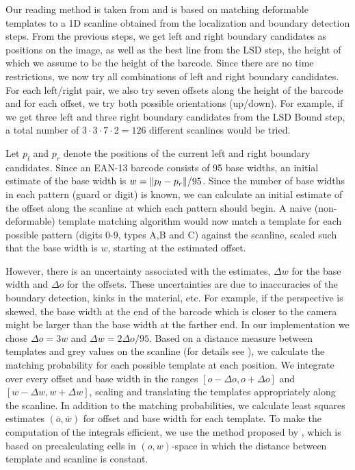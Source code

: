 

Our reading method is taken from \cite{Gallo2011} and is based on matching
deformable templates to a 1D scanline obtained from the localization and
boundary detection steps.
From the previous steps, we get left and right boundary candidates as
positions on the image, as well as the best line from the LSD step, the height
of which we assume to be the height of the barcode.
Since there are no time restrictions, we now try all combinations of left and
right boundary candidates. For each left/right pair, we also try seven offsets
along the height of the barcode and for each offset, we try both possible
orientations (up/down). For example, if we get three left and three right
boundary candidates from the LSD Bound step, a total number of $3\cdot
3\cdot 7 \cdot 2=126$ different scanlines would be tried.

Let $p_l$ and $p_r$ denote the positions of the current left and right boundary
candidates. Since an EAN-13 barcode consists of 95 base widths, an initial
estimate of the base width is $w=\lVert p_l-p_r\rVert/95$. Since the number of base
widths in each pattern (guard or digit) is known, we can calculate an initial
estimate of the offset along the scanline at which each pattern should begin. A
naive (non-deformable) template matching algorithm would now match a template
for each possible pattern (digits 0-9, types A,B and C) against the scanline,
scaled such that the base width is $w$, starting at the estimated offset.

However, there is an uncertainty associated with the estimates, $\Delta w$ for
the base width and $\Delta o$ for the offsets. These uncertainties are due to
inaccuracies of the boundary detection, kinks in the material, etc. For example,
if the perspective is skewed, the base width at the end of the barcode which is
closer to the camera might be larger than the base width at the farther end. In
our implementation we chose $\Delta o=3w$ and $\Delta w=2\Delta o/95$. Based on a distance measure between
templates and grey values on the scanline (for details see \cite{Gallo2011}), we calculate the matching probability for each possible
template at each position. We integrate over every offset and base width in the
ranges $[o-\Delta o, o+\Delta o]$ and $[w-\Delta w, w+\Delta w]$, scaling and translating the
templates appropriately along the scanline. In addition to the matching
probabilities, we calculate least squares estimates $(\bar{o}, \bar{w})$ for
offset and base width for each template.
To make the computation of the
integrals efficient, we use the method proposed by \citeauthor{Gallo2011}, which
is based on precalculating cells in $(o, w)$-space in which the distance between
template and scanline is constant.

